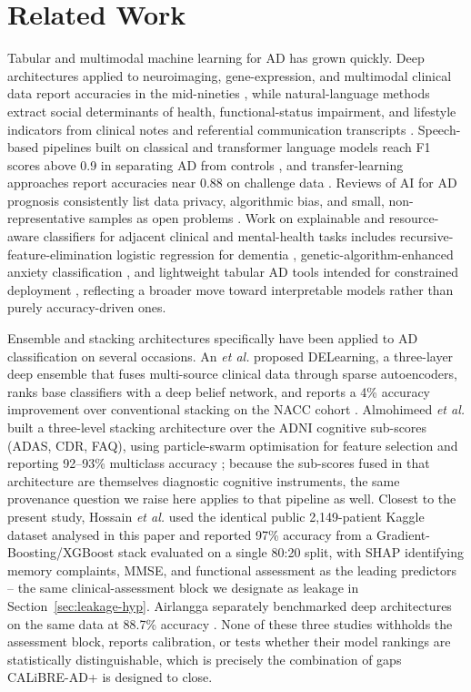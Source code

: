 \documentclass[conference]{IEEEtran}
\begin{document}
\section{Related Work}
\label{sec:related}
Tabular and multimodal machine learning for AD has grown quickly. Deep architectures applied to neuroimaging, gene-expression, and multimodal clinical data report accuracies in the mid-nineties \cite{b1,b2,b9}, while natural-language methods extract social determinants of health, functional-status impairment, and lifestyle indicators from clinical notes and referential communication transcripts \cite{b3,b4,b5,b8}. Speech-based pipelines built on classical and transformer language models reach F1 scores above 0.9 in separating AD from controls \cite{b7,b10}, and transfer-learning approaches report accuracies near 0.88 on challenge data \cite{b11,b12}. Reviews of AI for AD prognosis consistently list data privacy, algorithmic bias, and small, non-representative samples as open problems \cite{b6}. Work on explainable and resource-aware classifiers for adjacent clinical and mental-health tasks includes recursive-feature-elimination logistic regression for dementia \cite{b22}, genetic-algorithm-enhanced anxiety classification \cite{b23}, and lightweight tabular AD tools intended for constrained deployment \cite{b28}, reflecting a broader move toward interpretable models rather than purely accuracy-driven ones.

Ensemble and stacking architectures specifically have been applied to AD classification on several occasions. An \textit{et al.} proposed DELearning, a three-layer deep ensemble that fuses multi-source clinical data through sparse autoencoders, ranks base classifiers with a deep belief network, and reports a 4\% accuracy improvement over conventional stacking on the NACC cohort \cite{b36}. Almohimeed \textit{et al.} built a three-level stacking architecture over the ADNI cognitive sub-scores (ADAS, CDR, FAQ), using particle-swarm optimisation for feature selection and reporting 92--93\% multiclass accuracy \cite{b38}; because the sub-scores fused in that architecture are themselves diagnostic cognitive instruments, the same provenance question we raise here applies to that pipeline as well. Closest to the present study, Hossain \textit{et al.} used the identical public 2{,}149-patient Kaggle dataset analysed in this paper and reported 97\% accuracy from a Gradient-Boosting/XGBoost stack evaluated on a single 80:20 split, with SHAP identifying memory complaints, MMSE, and functional assessment as the leading predictors \cite{b37} -- the same clinical-assessment block we designate as leakage in Section~\ref{sec:leakage-hyp}. Airlangga separately benchmarked deep architectures on the same data at 88.7\% accuracy \cite{b20}. None of these three studies withholds the assessment block, reports calibration, or tests whether their model rankings are statistically distinguishable, which is precisely the combination of gaps CALiBRE-AD+ is designed to close.
\end{document}
